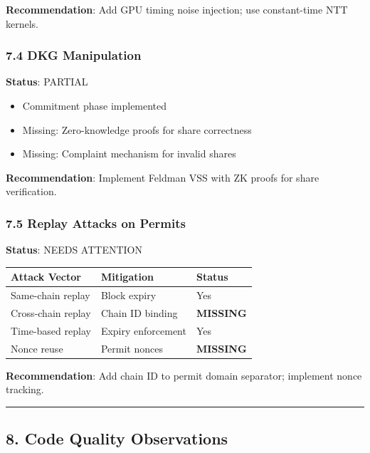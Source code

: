 \documentclass[
]{article}
\newcounter{none} %
\providecommand{\tightlist}{%
  \setlength{\itemsep}{0pt}\setlength{\parskip}{0pt}}
\begin{document}
\textbf{Recommendation}: Add GPU timing noise injection; use
constant-time NTT kernels.

\subsubsection{7.4 DKG Manipulation}\label{74-dkg-manipulation}

\textbf{Status}: PARTIAL

\begin{itemize}
\tightlist
\item
  Commitment phase implemented
\item
  Missing: Zero-knowledge proofs for share correctness
\item
  Missing: Complaint mechanism for invalid shares
\end{itemize}

\textbf{Recommendation}: Implement Feldman VSS with ZK proofs for share
verification.

\subsubsection{7.5 Replay Attacks on
Permits}\label{75-replay-attacks-on-permits}

\textbf{Status}: NEEDS ATTENTION

{\def\LTcaptype{none} %
\begin{longtable}[]{@{}lll@{}}
\toprule\noalign{}
Attack Vector & Mitigation & Status \\
\midrule\noalign{}
\endhead
\bottomrule\noalign{}
\endlastfoot
Same-chain replay & Block expiry & Yes \\
Cross-chain replay & Chain ID binding & \textbf{MISSING} \\
Time-based replay & Expiry enforcement & Yes \\
Nonce reuse & Permit nonces & \textbf{MISSING} \\
\end{longtable}
}

\textbf{Recommendation}: Add chain ID to permit domain separator;
implement nonce tracking.

\begin{center}\rule{0.5\linewidth}{0.5pt}\end{center}

\subsection{8. Code Quality
Observations}\label{8-code-quality-observations}
\end{document}
